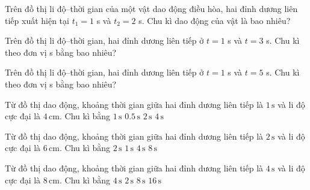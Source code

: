 \begin{ex}%
Trên đồ thị li độ–thời gian của một vật dao động điều hòa, hai đỉnh dương liên tiếp xuất hiện tại $t_1 = 1$ s và $t_2 = 2$ s. Chu kì dao động của vật là bao nhiêu?
\end{ex}

\begin{ex}
Trên đồ thị li độ–thời gian, hai đỉnh dương liên tiếp ở $t=1$ s và $t=3$ s. Chu kì theo đơn vị s bằng bao nhiêu?
\end{ex}

\begin{ex}
Trên đồ thị li độ–thời gian, hai đỉnh dương liên tiếp ở $t=1$ s và $t=5$ s. Chu kì theo đơn vị s bằng bao nhiêu?
\end{ex}

\begin{ex}
Từ đồ thị dao động, khoảng thời gian giữa hai đỉnh dương liên tiếp là $1\,\text{s}$ và li độ cực đại là $4\,\text{cm}$. Chu kì bằng
\choice
{\True $1\,\text{s}$}
{$0.5\,\text{s}$}
{$2\,\text{s}$}
{$4\,\text{s}$}
\end{ex}

\begin{ex}
Từ đồ thị dao động, khoảng thời gian giữa hai đỉnh dương liên tiếp là $2\,\text{s}$ và li độ cực đại là $6\,\text{cm}$. Chu kì bằng
\choice
{\True $2\,\text{s}$}
{$1\,\text{s}$}
{$4\,\text{s}$}
{$8\,\text{s}$}
\end{ex}

\begin{ex}
Từ đồ thị dao động, khoảng thời gian giữa hai đỉnh dương liên tiếp là $4\,\text{s}$ và li độ cực đại là $8\,\text{cm}$. Chu kì bằng
\choice
{\True $4\,\text{s}$}
{$2\,\text{s}$}
{$8\,\text{s}$}
{$16\,\text{s}$}
\end{ex}

